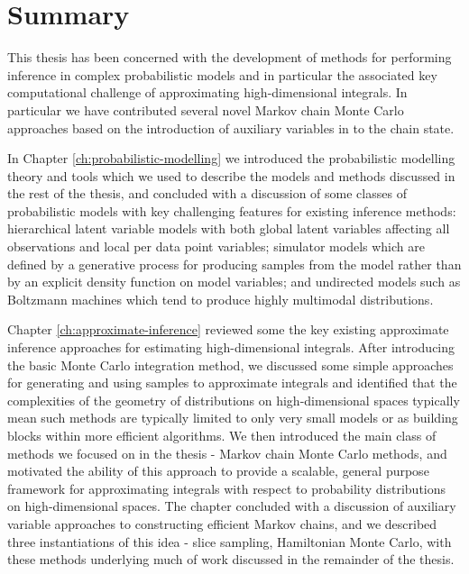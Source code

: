 \chapter{Summary}\label{ch:conclusions}

This thesis has been concerned with the development of methods for performing inference in complex probabilistic models and in particular the associated key computational challenge of approximating high-dimensional integrals. In particular we have contributed several novel Markov chain Monte Carlo approaches based on the introduction of auxiliary variables in to the chain state.

In Chapter \ref{ch:probabilistic-modelling} we introduced the probabilistic modelling theory and tools which we used to describe the models and methods discussed in the rest of the thesis, and concluded with a discussion of some classes of probabilistic models with key challenging features for existing inference methods: hierarchical latent variable models with both global latent variables affecting all observations and local per data point variables; simulator models which are defined by a generative process for producing samples from the model rather than by an explicit density function on model variables; and undirected models such as Boltzmann machines which tend to produce highly multimodal distributions.

Chapter \ref{ch:approximate-inference} reviewed some the key existing approximate inference approaches for estimating high-dimensional integrals. After introducing the basic Monte Carlo integration method, we discussed some simple approaches for generating and using samples to approximate integrals and identified that the complexities of the geometry of distributions on high-dimensional spaces typically mean such methods are typically limited to only very small models or as building blocks within more efficient algorithms. We then introduced the main class of methods we focused on in the thesis - Markov chain Monte Carlo methods, and motivated the ability of this approach to  provide a scalable, general purpose framework for approximating integrals with respect to probability distributions on high-dimensional spaces. The chapter concluded with a discussion of auxiliary variable approaches to constructing efficient Markov chains, and we described three instantiations of this idea - slice sampling, Hamiltonian Monte Carlo, with these methods underlying much of work discussed in the remainder of the thesis.


